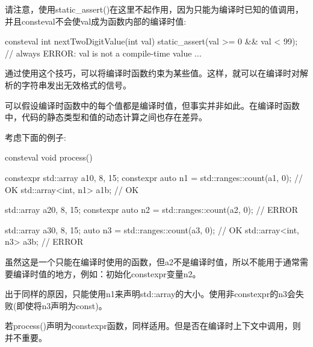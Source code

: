 请注意，使用static\_assert()在这里不起作用，因为只能为编译时已知的值调用，并且consteval不会使val成为函数内部的编译时值:

\begin{cpp}
consteval int nextTwoDigitValue(int val)
{
	static_assert(val >= 0 && val < 99); // always ERROR: val is not a compile-time value
	...
}
\end{cpp}

通过使用这个技巧，可以将编译时函数约束为某些值。这样，就可以在编译时对解析的字符串发出无效格式的信号。


可以假设编译时函数中的每个值都是编译时值，但事实并非如此。在编译时函数中，代码的静态类型和值的动态计算之间也存在差异。

考虑下面的例子:

\begin{cpp}
consteval void process()
{
	constexpr std::array a1{0, 8, 15};
	constexpr auto n1 = std::ranges::count(a1, 0); // OK
	std::array<int, n1> a1b; // OK
	
	std::array a2{0, 8, 15};
	constexpr auto n2 = std::ranges::count(a2, 0); // ERROR
	
	std::array a3{0, 8, 15};
	auto n3 = std::ranges::count(a3, 0); // OK
	std::array<int, n3> a3b; // ERROR
}
\end{cpp}

虽然这是一个只能在编译时使用的函数，但a2不是编译时值，所以不能用于通常需要编译时值的地方，例如：初始化constexpr变量n2。

出于同样的原因，只能使用n1来声明std::array的大小。使用非constexpr的n3会失败(即使将n3声明为const)。

若process()声明为constexpr函数，同样适用。但是否在编译时上下文中调用，则并不重要。





